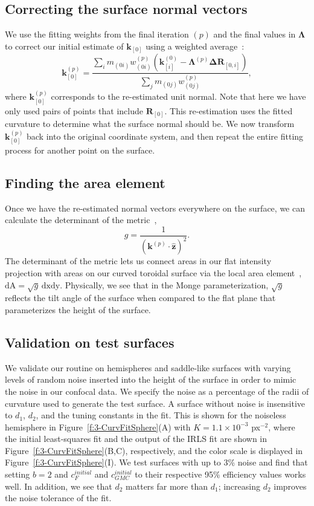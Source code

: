 \subsection{Correcting the surface normal vectors}
We use the fitting weights from the final iteration $(p)$ and the final values in $\bm{\Lambda}$ to correct our initial estimate of $\mathbf{k}_{[0]}$ using a weighted average~\cite{RN31}:
\begin{equation}
\mathbf{k}_{[0]}^{(p)} = \frac{\sum\limits_i m_{(0i)}w_{(0i)}^{(p)}(\mathbf{k}_{[i]}^{(0)} - \mathbf{\Lambda}^{(p)}\mathbf{\Delta R}_{[0,i]})}{\sum\limits_j m_{(0j)}w_{(0j)}^{(p)}},
\end{equation}
where $\mathbf{k}_{[0]}^{(p)}$ corresponds to the re-estimated unit normal.
Note that here we have only used pairs of points that include $\mathbf{R}_{[0]}$.
This re-estimation uses the fitted curvature to determine what the surface normal should be.
We now transform $\mathbf{k}_{[0]}^{(p)}$ back into the original coordinate system, and then repeat the entire fitting process for another point on the surface.


\subsection{Finding the area element}
Once we have the re-estimated normal vectors everywhere on the surface, we can calculate the determinant of the metric~\cite{RN35},
\begin{equation}
g = \frac{1}{(\mathbf{k}^{(p)} \cdot \mathbf{\hat{z}})^2}.
\end{equation}
The determinant of the metric lets us connect areas in our flat intensity projection with areas on our curved toroidal surface via the local area element~\cite{RN35}, $\textrm{dA} = \sqrt{g} \, \textrm{dx}\textrm{dy}$.
Physically, we see that in the Monge parameterization, $\sqrt{g}$ reflects the tilt angle of the surface when compared to the flat plane that parameterizes the height of the surface.


\subsection{Validation on test surfaces}
We validate our routine on hemispheres and saddle-like surfaces with varying levels of random noise inserted into the height of the surface in order to mimic the noise in our confocal data.
We specify the noise as a percentage of the radii of curvature used to generate the test surface.
A surface without noise is insensitive to $d_1$, $d_2$, and the tuning constants in the fit.
This is shown for the noiseless hemisphere in Figure~\ref{f:3-CurvFitSphere}(A) with $K = 1.1 \times 10^{-3}$ px$^{-2}$, where the initial least-squares fit and the output of the IRLS fit are shown in Figure~\ref{f:3-CurvFitSphere}(B,C), respectively, and the color scale is displayed in Figure~\ref{f:3-CurvFitSphere}(I).
We test surfaces with up to 3\% noise and find that setting $b=2$ and $c_{F}^{initial}$ and $c_{GMC}^{initial}$ to their respective 95\% efficiency values works well.
In addition, we see that $d_2$ matters far more than $d_1$; increasing $d_2$ improves the noise tolerance of the fit.

